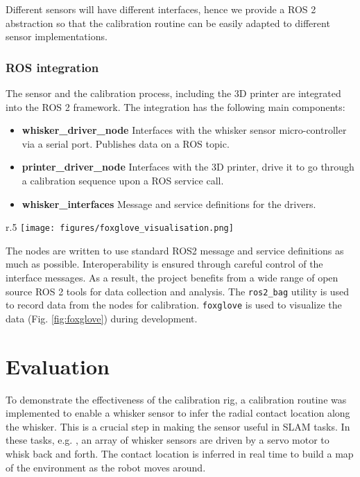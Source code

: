 \documentclass[runningheads]{llncs}
\begin{document}
Different sensors will have different interfaces, hence we provide a ROS 2 abstraction so that the calibration routine can be easily adapted to different sensor implementations.

\subsubsection{ROS integration}

The sensor and the calibration process, including the 3D printer are integrated into the ROS 2 framework. The integration has the following main components:

\begin{itemize}
    \item \textbf{whisker\_driver\_node} Interfaces with the whisker sensor micro-controller via a serial port. Publishes data on a ROS topic.
    \item \textbf{printer\_driver\_node} Interfaces with the 3D printer, drive it to go through a calibration sequence upon a ROS service call.
    \item \textbf{whisker\_interfaces} Message and service definitions for the drivers.
\end{itemize}

\begin{wrapfigure}{r}{.5\textwidth}
    \centering
    \texttt{[image: figures/foxglove\_visualisation.png]}
    \caption{Foxglove visualization of whisker sensor system running in ROS 2}
    \label{fig:foxglove}
\end{wrapfigure}

The nodes are written to use standard ROS2 message and service definitions as much as possible. Interoperability is ensured through careful control of the interface messages. As a result, the project benefits from a wide range of open source ROS 2 tools for data collection and analysis. The \verb|ros2_bag| utility is used to record data from the nodes for calibration. \verb|foxglove| is used to visualize the data (Fig. \ref{fig:foxglove}) during development.

\section{Evaluation}

To demonstrate the effectiveness of the calibration rig, a calibration routine was implemented to enable a whisker sensor to infer the radial contact location along the whisker. This is a crucial step in making the sensor useful in SLAM tasks. In these tasks, e.g. \cite{pearsonSimultaneousLocalisationMapping2013} \cite{leporaNaiveBayesNovelty2010}, an array of whisker sensors are driven by a servo motor to whisk back and forth. The contact location is inferred in real time to build a map of the environment as the robot moves around.
\end{document}
